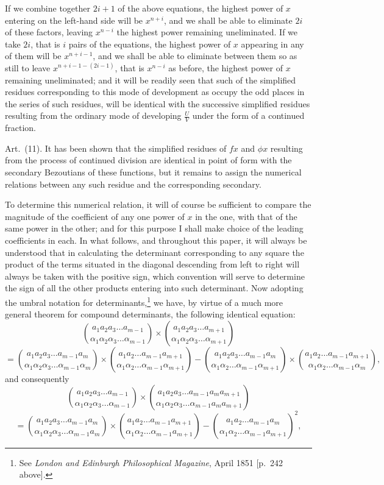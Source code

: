 \documentclass[11pt]{article}
\newcommand{\sourcepage}[1]{\marginpar{\scriptsize p.~#1}}
\newcommand{\art}[1]{\par\smallskip\noindent Art.~(#1).\quad}
\begin{document}
\sourcepage{453}
If we combine together $2i+1$ of the above equations, the highest power of $x$ entering on the left-hand side will be $x^{n+i}$, and we shall be able to eliminate $2i$ of these factors, leaving $x^{n-i}$ the highest power remaining uneliminated. If we take $2i$, that is $i$ pairs of the equations, the highest power of $x$ appearing in any of them will be $x^{n+i-1}$, and we shall be able to eliminate between them so as still to leave $x^{n+i-1-(2i-1)}$, that is $x^{n-i}$ as before, the highest power of $x$ remaining uneliminated; and it will be readily seen that such of the simplified residues corresponding to this mode of development as occupy the odd places in the series of such residues, will be identical with the successive simplified residues resulting from the ordinary mode of developing $\frac{U}{V}$ under the form of a continued fraction.

\art{11} It has been shown that the simplified residues of $fx$ and $\phi x$ resulting from the process of continued division are identical in point of form with the secondary Bezoutians of these functions, but it remains to assign the numerical relations between any such residue and the corresponding secondary.

To determine this numerical relation, it will of course be sufficient to compare the magnitude of the coefficient of any one power of $x$ in the one, with that of the same power in the other; and for this purpose I shall make choice of the leading coefficients in each. In what follows, and throughout this paper, it will always be understood that in calculating the determinant corresponding to any square the product of the terms situated in the diagonal descending from left to right will always be taken with the positive sign, which convention will serve to determine the sign of all the other products entering into such determinant. Now adopting the umbral notation for determinants,\footnote{See \emph{London and Edinburgh Philosophical Magazine}, April 1851 [p.~242 above].} we have, by virtue of a much more general theorem for compound determinants, the following identical equation:
\begingroup\scriptsize
\[
\binom{a_1a_2a_3\ldots a_{m-1}}{\alpha_1\alpha_2\alpha_3\ldots\alpha_{m-1}}
\times
\binom{a_1a_2a_3\ldots a_{m+1}}{\alpha_1\alpha_2\alpha_3\ldots\alpha_{m+1}}
\]
\[
=
\binom{a_1a_2a_3\ldots a_{m-1}a_m}{\alpha_1\alpha_2\alpha_3\ldots\alpha_{m-1}\alpha_m}
\times
\binom{a_1a_2\ldots a_{m-1}a_{m+1}}{\alpha_1\alpha_2\ldots\alpha_{m-1}\alpha_{m+1}}
-
\binom{a_1a_2a_3\ldots a_{m-1}a_m}{\alpha_1\alpha_2\ldots\alpha_{m-1}\alpha_{m+1}}
\times
\binom{a_1a_2\ldots a_{m-1}a_{m+1}}{\alpha_1\alpha_2\ldots\alpha_{m-1}\alpha_m},
\]
and consequently
\[
\binom{a_1a_2a_3\ldots a_{m-1}}{\alpha_1\alpha_2\alpha_3\ldots\alpha_{m-1}}
\times
\binom{a_1a_2a_3\ldots a_{m-1}a_ma_{m+1}}{\alpha_1\alpha_2\alpha_3\ldots\alpha_{m-1}a_ma_{m+1}}
\]
\[
=
\binom{a_1a_2a_3\ldots a_{m-1}a_m}{\alpha_1\alpha_2\alpha_3\ldots\alpha_{m-1}a_m}
\times
\binom{a_1a_2\ldots a_{m-1}a_{m+1}}{\alpha_1\alpha_2\ldots\alpha_{m-1}a_{m+1}}
-
\binom{a_1a_2\ldots a_{m-1}a_m}{\alpha_1\alpha_2\ldots\alpha_{m-1}a_{m+1}}^2,
\]
\endgroup
\end{document}
